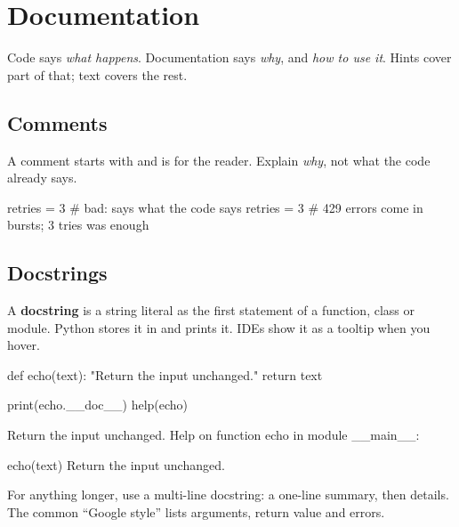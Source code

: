 \section{Documentation}

Code says \emph{what happens}. Documentation says \emph{why}, and \emph{how to use it}. Hints cover part of that;
text covers the rest.

\subsection{Comments}

A comment starts with \code{\#} and is for the reader. Explain \emph{why}, not what the code already says.

\begin{pycode}
retries = 3                    # bad: says what the code says
retries = 3                    # 429 errors come in bursts; 3 tries was enough
\end{pycode}

\subsection{Docstrings}

A \textbf{docstring} is a string literal as the first statement of a function, class or module. Python stores it in
 and  prints it. IDEs show it as a tooltip when you hover.

\begin{pycode}
def echo(text):
    "Return the input unchanged."
    return text

print(echo.__doc__)
help(echo)
\end{pycode}
\begin{rawcode}
Return the input unchanged.
Help on function echo in module __main__:

echo(text)
    Return the input unchanged.
\end{rawcode}

For anything longer, use a multi-line docstring: a one-line summary, then details. The common ``Google style'' lists
arguments, return value and errors.

